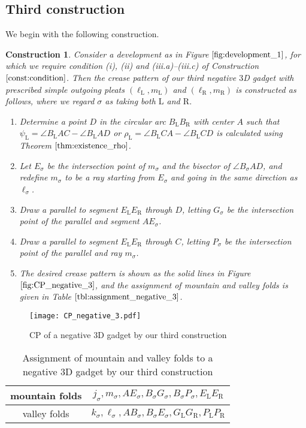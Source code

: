 \documentclass[11pt]{amsart}
\newtheorem{construction}[theorem]{Construction}
\numberwithin{equation}{section}
\numberwithin{theorem}{section}
\newcommand{\Lt}{\ensuremath{\mathrm{L}}}
\newcommand{\Rt}{\ensuremath{\mathrm{R}}}
\begin{document}
\subsection{Third construction}\label{subsec:negative_new_3}
We begin with the following construction.
\begin{construction}\label{const:negative_3}\rm
Consider a development as in Figure $\ref{fig:development_1}$, 
for which we require condition (i), (ii) and (iii.a)--(iii.c) of Construction $\ref{const:condition}$.
Then the crease pattern of our third negative $3$D gadget with prescribed simple outgoing pleats $(\ell_\Lt ,m_\Lt )$ and $(\ell_\Rt ,m_\Rt )$
is constructed as follows, where we regard $\sigma$ as taking both $\Lt$ and $\Rt$.
\begin{enumerate}
\item Determine  a point $D$ in the circular arc $B_\Lt B_\Rt$ with center $A$ 
such that $\psi_\Lt =\angle B_\Lt AC -\angle B_\Lt AD$ or $\rho_\Lt =\angle B_\Lt CA -\angle B_\Lt CD$ is calculated using Theorem $\ref{thm:existence_rho}$.
\item Let $E_\sigma$ be the intersection point of $m_\sigma$ and the bisector of $\angle B_\sigma AD$,
and redefine $m_\sigma$ to be a ray starting from $E_\sigma$ and going in the same direction as $\ell_\sigma$.
\item Draw a parallel to segment $E_\Lt E_\Rt$ through $D$, letting $G_\sigma$ be the intersection point of the parallel and segment $AE_\sigma$.
\item Draw a parallel to segment $E_\Lt E_\Rt$ through $C$, letting $P_\sigma$ be the intersection point of the parallel and ray $m_\sigma$.
\item The desired crease pattern is shown as the solid lines in Figure $\ref{fig:CP_negative_3}$, 
and the assignment of mountain and valley folds is given in Table $\ref{tbl:assignment_negative_3}$.
\end{enumerate}
\end{construction}
\begin{figure}[htbp]
\addtocounter{theorem}{1}
\centering\texttt{[image: CP\_negative\_3.pdf]}
    \caption{CP of a negative $3$D gadget by our third construction}
    \label{fig:CP_negative_3}
\end{figure}
\addtocounter{theorem}{1}
\begin{table}[h]
\begin{tabular}{c|c}
mountain folds&$j_\sigma ,m_\sigma ,AE_\sigma ,B_\sigma G_\sigma ,B_\sigma P_\sigma, E_\Lt E_\Rt$\\ \hline
valley folds&$k_\sigma ,\ell_\sigma ,AB_\sigma ,B_\sigma E_\sigma ,G_\Lt G_\Rt ,P_\Lt P_\Rt$
\end{tabular}\vspace{0.5cm}
\caption{Assignment of mountain and valley folds to a negative $3$D gadget by our third construction}
\label{tbl:assignment_negative_3}
\end{table}
\end{document}
